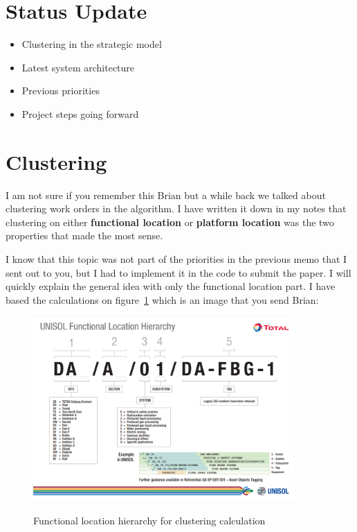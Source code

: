 \section{Status Update}

\begin{itemize}
	\item Clustering in the strategic model
	\item Latest system architecture
	\item Previous priorities
	\item Project steps going forward
\end{itemize}

\section{Clustering}
% 

I am not sure if you remember this Brian but a while back we
talked about clustering work orders in the algorithm. I have written
it down in my notes that clustering on either \textbf{functional location}
or \textbf{platform location} was the two properties that made the most
sense.

I know that this topic was not part of the priorities in the previous memo that
I sent out to you, but I had to implement it in the code to submit the paper. I
will quickly explain the general idea with only the functional location part. I
have based the calculations on figure~\ref{fig:functional-location} which is an
image that you send Brian:

\begin{figure}[H]
	\centering
	\includegraphics[width=10cm]{../../../figures/total-figures/functional_location_total.png}\label{fig:functional-location}
	\caption{Functional location hierarchy for clustering calculation}
\end{figure}

